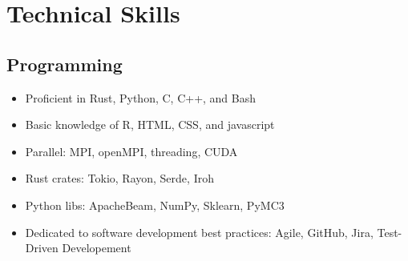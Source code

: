 


\vspace{-10pt}
\section{Technical Skills}
\vspace{-15pt}
\begin{multicols}{2}
\subsection{Programming}
\begin{itemize}
\item{Proficient in Rust, Python, C, C++, and Bash}
\item{Basic knowledge of R, HTML, CSS, and javascript}
\item{Parallel: MPI, openMPI, threading, CUDA}
\item{Rust crates: Tokio, Rayon, Serde, Iroh}
\item{Python libs: ApacheBeam, NumPy, Sklearn, PyMC3}
\item{Dedicated to software development best practices: Agile, GitHub, Jira, Test-Driven Developement}
\end{itemize}


\end{multicols}
